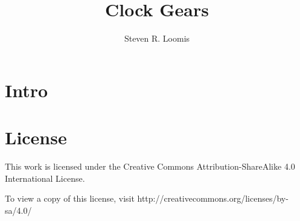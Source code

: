 \documentclass[11pt]{amsart}
\title{Clock Gears}
\author{Steven R. Loomis}
\date{}                                           %
\begin{document}
\maketitle

\section{Intro}



\section{License}
This work is licensed under the Creative Commons Attribution-ShareAlike 4.0 International License.

To view a copy of this license, visit http://creativecommons.org/licenses/by-sa/4.0/
\end{document}
